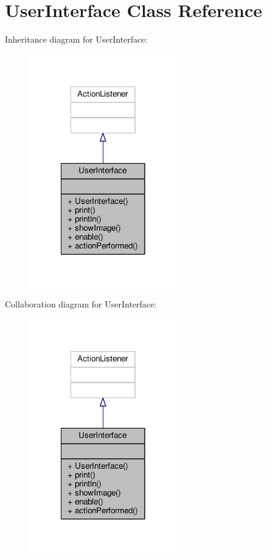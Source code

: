 \hypertarget{classUserInterface}{\section{User\-Interface Class Reference}
\label{classUserInterface}
}


Inheritance diagram for User\-Interface\-:
\nopagebreak
\begin{figure}[H]
\begin{center}
\leavevmode
\includegraphics[width=182pt]{classUserInterface__inherit__graph}
\end{center}
\end{figure}


Collaboration diagram for User\-Interface\-:
\nopagebreak
\begin{figure}[H]
\begin{center}
\leavevmode
\includegraphics[width=182pt]{classUserInterface__coll__graph}
\end{center}
\end{figure}
